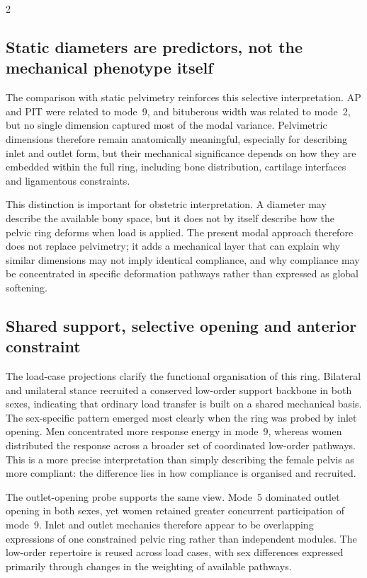 \documentclass[openacc]{rsproca_new}
\begin{document}
\begin{multicols}{2}
\subsection{Static diameters are predictors, not the mechanical phenotype itself}

The comparison with static pelvimetry reinforces this selective interpretation. AP and PIT were related to mode~9, and bituberous width was related to mode~2, but no single dimension captured most of the modal variance. Pelvimetric dimensions therefore remain anatomically meaningful, especially for describing inlet and outlet form, but their mechanical significance depends on how they are embedded within the full ring, including bone distribution, cartilage interfaces and ligamentous constraints.

This distinction is important for obstetric interpretation. A diameter may describe the available bony space, but it does not by itself describe how the pelvic ring deforms when load is applied. The present modal approach therefore does not replace pelvimetry; it adds a mechanical layer that can explain why similar dimensions may not imply identical compliance, and why compliance may be concentrated in specific deformation pathways rather than expressed as global softening.

\subsection{Shared support, selective opening and anterior constraint}

The load-case projections clarify the functional organisation of this ring. Bilateral and unilateral stance recruited a conserved low-order support backbone in both sexes, indicating that ordinary load transfer is built on a shared mechanical basis. The sex-specific pattern emerged most clearly when the ring was probed by inlet opening. Men concentrated more response energy in mode~9, whereas women distributed the response across a broader set of coordinated low-order pathways. This is a more precise interpretation than simply describing the female pelvis as more compliant: the difference lies in how compliance is organised and recruited.

The outlet-opening probe supports the same view. Mode~5 dominated outlet opening in both sexes, yet women retained greater concurrent participation of mode~9. Inlet and outlet mechanics therefore appear to be overlapping expressions of one constrained pelvic ring rather than independent modules. The low-order repertoire is reused across load cases, with sex differences expressed primarily through changes in the weighting of available pathways.


\end{multicols}
\end{document}
